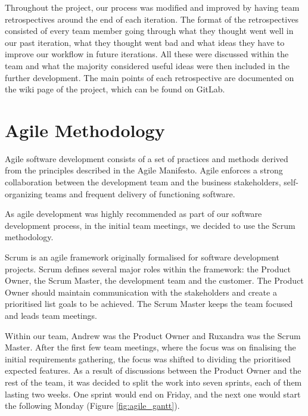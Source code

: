 \documentclass{l3proj}
\begin{document}
Throughout the project, our process was modified and improved by having team
 retrospectives around the end of each iteration. The format of the retrospectives
 consisted of every team member going through what they thought went well in
 our past iteration, what they thought went bad and what ideas they have to
 improve our workflow in future iterations. All these were discussed within
 the team and what the majority considered useful ideas were then included
 in the further development. The main points of each retrospective are
 documented on the wiki page of the project, which can be found on GitLab.

\section{Agile Methodology} %
\label{sec:agile}


Agile software development consists of a set of practices and methods derived
 from the principles described in the Agile Manifesto. Agile enforces a strong
 collaboration between the development team and the business stakeholders,
 self-organizing teams and frequent delivery of functioning
 software\cite{agile_overview}.

As agile development was highly recommended as part of our software development
 process, in the initial team meetings, we decided to use the Scrum
 methodology.

 Scrum is an agile framework originally formalised for software development
 projects. Scrum defines several major roles within the framework: the Product
 Owner, the Scrum Master, the development team and the customer. The Product
 Owner should maintain communication with the stakeholders and create a prioritised
 list goals to be achieved. The Scrum Master keeps the team focused and leads team
 meetings\cite{scrum_overview}.

 Within our team, Andrew was the Product Owner and Ruxandra was the Scrum Master.
  After the first few team meetings, where the focus was on finalising the initial
  requirements gathering, the focus was shifted to dividing the prioritised
  expected features. As a result of discussions between the Product Owner and
  the rest of the team, it was decided to split the work into seven sprints,
  each of them lasting two weeks. One sprint would end on Friday, and the next
  one would start the following Monday (Figure \ref{fig:agile_gantt}).
\end{document}
